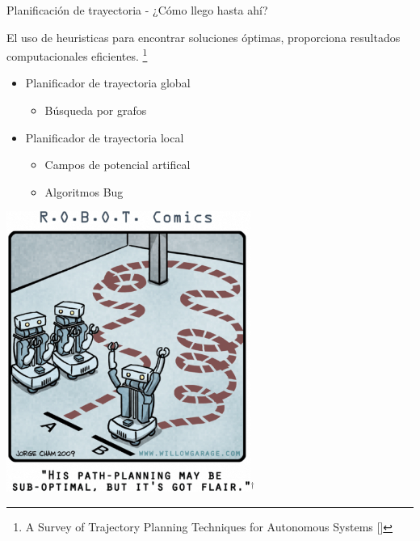 \documentclass[
  24pt, %
  aspectratio=169, %
]{beamer}
\begin{document}
\begin{frame}{Planificación de trayectoria - ¿Cómo llego hasta ahí?}
  \begin{minipage}{0.57\textwidth}

    El uso de heuristicas para encontrar soluciones óptimas, proporciona resultados computacionales eficientes. \footnote{A Survey of Trajectory Planning Techniques for Autonomous Systems [\cite{Mir2022}]} 
    \bigskip %
    \begin{itemize}
    \item Planificador de trayectoria global
      \begin{itemize}
      \item Búsqueda por grafos
      \end{itemize}
      \bigskip %
    \item Planificador de trayectoria local
      \begin{itemize}
      \item Campos de potencial artifical
      \item Algoritmos Bug
      \end{itemize}
    \end{itemize}
    \bigskip %
  \end{minipage}
  \hspace{0.2cm}
  \begin{minipage}{0.4\textwidth}
    \includegraphics[width=0.6\textwidth]{img5}$^\dag$\\
  \end{minipage}
\end{frame}
\end{document}
